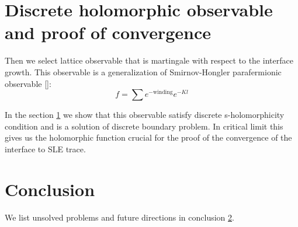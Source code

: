 \documentclass[12pt]{article}
\begin{document}
\section{Discrete holomorphic observable and proof of convergence}
\label{sec:discr-holom-observ}

 Then we
select lattice observable that is martingale with respect to the interface growth.
This observable is a generalization of Smirnov-Hongler parafermionic observable []:
\begin{equation}
  \label{eq:3}
  f = \sum e^{-\mbox{winding}} e^{-Kl}
\end{equation}

In the section \ref{sec:discr-holom-observ} we show that this observable satisfy discrete s-holomorphicity
condition and is a solution of discrete boundary problem. In critical limit this gives us the
holomorphic function crucial for the proof of the convergence of the interface to SLE trace.

\section{Conclusion}
\label{sec:conclusion}

We list unsolved problems and future directions in conclusion \ref{sec:conclusion}.

{} 

\end{document}

